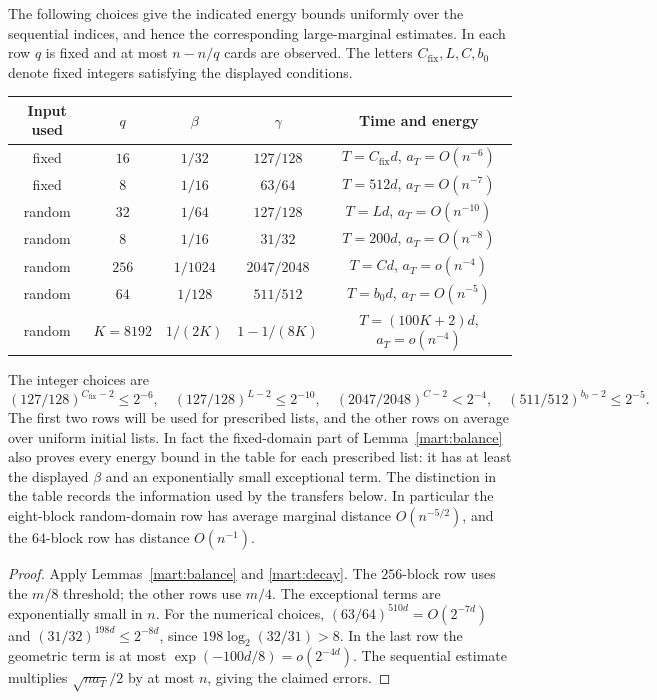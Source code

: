 \begin{proposition}\label{mart:marginals}
The following choices give the indicated energy bounds uniformly over
the sequential indices, and hence the corresponding large-marginal
estimates.  In each row $q$ is fixed and at most $n-n/q$ cards are
observed.  The letters $C_{\mathrm{fix}},L,C,b_0$ denote fixed integers satisfying
the displayed conditions.
\begin{center}
\begin{tabular}{c c c c c}
Input used & $q$ & $\beta$ & $\gamma$ & Time and energy\\ \hline
fixed & $16$ & $1/32$ & $127/128$ &
$T=C_{\mathrm{fix}}d$, $a_T=O(n^{-6})$\\
fixed & $8$ & $1/16$ & $63/64$ &
$T=512d$, $a_T=O(n^{-7})$\\
random & $32$ & $1/64$ & $127/128$ &
$T=Ld$, $a_T=O(n^{-10})$\\
random & $8$ & $1/16$ & $31/32$ &
$T=200d$, $a_T=O(n^{-8})$\\
random & $256$ & $1/1024$ & $2047/2048$ &
$T=Cd$, $a_T=o(n^{-4})$\\
random & $64$ & $1/128$ & $511/512$ &
$T=b_0d$, $a_T=O(n^{-5})$\\
random & $K=8192$ & $1/(2K)$ & $1-1/(8K)$ &
$T=(100K+2)d$, $a_T=o(n^{-4})$
\end{tabular}
\end{center}
The integer choices are
\[
 (127/128)^{C_{\mathrm{fix}}-2}\le2^{-6},\quad
 (127/128)^{L-2}\le2^{-10},\quad
 (2047/2048)^{C-2}<2^{-4},\quad
 (511/512)^{b_0-2}\le2^{-5}.
\]
The first two rows will be used for prescribed lists, and the other
rows on average over uniform initial lists. In fact the fixed-domain
part of Lemma~\ref{mart:balance} also proves every energy bound in the
table for each prescribed list: it has at least the displayed $\beta$
and an exponentially small exceptional term. The distinction in the
table records the information used by the transfers below.
In particular the
eight-block random-domain row has average marginal distance
$O(n^{-5/2})$, and the $64$-block row has distance $O(n^{-1})$.
\end{proposition}
\begin{proof}
Apply Lemmas~\ref{mart:balance} and \ref{mart:decay}.  The $256$-block
row uses the $m/8$ threshold; the other rows use $m/4$.  The exceptional
terms are exponentially small in $n$.  For the numerical choices,
$(63/64)^{510d}=O(2^{-7d})$ and
$(31/32)^{198d}\le2^{-8d}$, since
$198\log_2(32/31)>8$.  In the last row the geometric term is at most
$\exp(-100d/8)=o(2^{-4d})$.  The sequential estimate multiplies
$\sqrt{na_T}/2$ by at most $n$, giving the claimed errors.
\end{proof}


